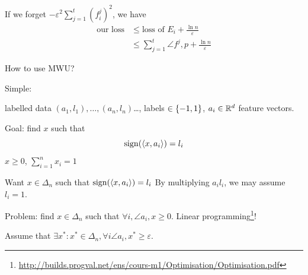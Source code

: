 If we forget $- \varepsilon^2 \sum\limits_{j=1}^t (f_i^j)^2$, we have
\[
    \begin{aligned}
        \text{our loss} &\leqslant \text{loss of }E_i + \frac{\ln n}{\varepsilon}\\
        &\leqslant\sum\limits_{j=1}^t \angle{f^j, p} + \frac{\ln n}{\varepsilon}
    \end{aligned}
\]

How to use MWU? 

Simple:

labelled data $(a_1,l_1), \ldots ,(a_n,l_n)$\dots, labels $\in \left\{ -1,1 \right\}$, $a_i \in \mathbb{R}^d$ feature vectors.

Goal: find $x$ such that
\[
    \operatorname{sign}(\left\langle x, a_i \right\rangle) = l_i
\]
$x \geqslant 0$, $\sum\limits_{i=1}^n x_i = 1$

Want $x \in \Delta_n$ such that $\operatorname{sign}(\left\langle x, a_i \right\rangle) = l_i$ By multiplying $a_i l_i$, we may assume $l_i = 1$.

Problem: find $x\in\Delta_n$ such that $\forall i, \angle{a_i,x} \geqslant 0$. Linear programming\footnote{\url{http://builds.progval.net/ens/cours-m1/Optimisation/Optimisation.pdf}}!

Assume that $\exists x^* : x^* \in \Delta_n, \forall i \angle{a_i, x^*} \geqslant \varepsilon$.

